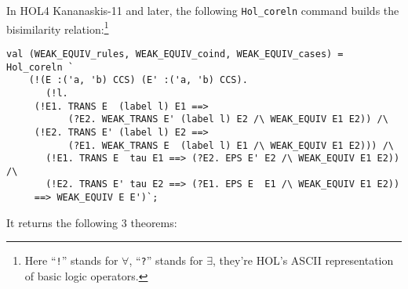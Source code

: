 In HOL4 Kananaskis-11 and later, the following \texttt{Hol_coreln}
command builds the bisimilarity relation:\footnote{Here ``\texttt{!}'' stands for
$\forall$, ``\texttt{?}'' stands for $\exists$, they're HOL's ASCII
representation of basic logic operators.}
\begin{lstlisting}
val (WEAK_EQUIV_rules, WEAK_EQUIV_coind, WEAK_EQUIV_cases) = Hol_coreln `
    (!(E :('a, 'b) CCS) (E' :('a, 'b) CCS).
       (!l.
	 (!E1. TRANS E  (label l) E1 ==>
	       (?E2. WEAK_TRANS E' (label l) E2 /\ WEAK_EQUIV E1 E2)) /\
	 (!E2. TRANS E' (label l) E2 ==>
	       (?E1. WEAK_TRANS E  (label l) E1 /\ WEAK_EQUIV E1 E2))) /\
       (!E1. TRANS E  tau E1 ==> (?E2. EPS E' E2 /\ WEAK_EQUIV E1 E2)) /\
       (!E2. TRANS E' tau E2 ==> (?E1. EPS E  E1 /\ WEAK_EQUIV E1 E2))
     ==> WEAK_EQUIV E E')`;
\end{lstlisting}
It returns the following 3 theorems:
